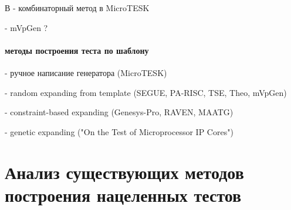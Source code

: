 \documentclass[14pt]{extreport}
\begin{document}


В - комбинаторный метод в MicroTESK

- mVpGen ?

\paragraph{методы построения теста по шаблону}

- ручное написание генератора (MicroTESK)

- random expanding from template (SEGUE, PA-RISC, TSE, Theo, mVpGen)

- constraint-based expanding (Genesys-Pro, RAVEN, MAATG)

- genetic expanding ("On the Test of Microprocessor IP Cores")

\section{Анализ существующих методов построения нацеленных тестов}
\end{document}
